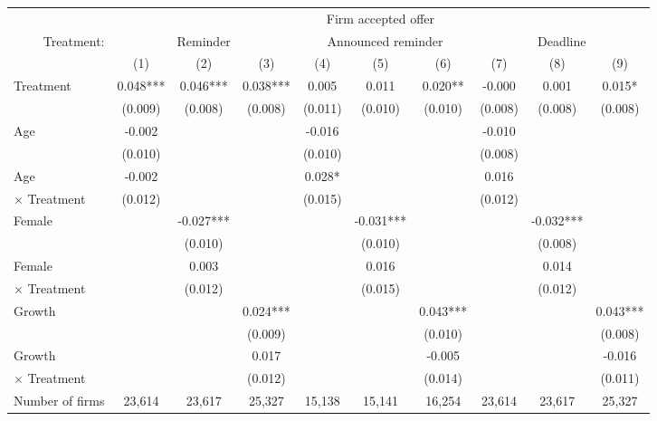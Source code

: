 \begin{tabular}{lccccccccc}
\toprule
 & \multicolumn{9}{c}{Firm accepted offer} \\
\cmidrule(lr){2-10}
\multicolumn{1}{r}{Treatment:} & \multicolumn{3}{c}{Reminder} & \multicolumn{3}{c}{Announced reminder} & \multicolumn{3}{c}{Deadline} \\
\cmidrule(lr){2-4} \cmidrule(lr){5-7} \cmidrule(lr){8-10}
 & (1) & (2) & (3) & (4) & (5) & (6) & (7) & (8) & (9) \\
\midrule
Treatment & 0.048*** & 0.046*** & 0.038*** & 0.005 & 0.011 & 0.020** & -0.000 & 0.001 & 0.015* \\ & (0.009) & (0.008) & (0.008) & (0.011) & (0.010) & (0.010) & (0.008) & (0.008) & (0.008) \\
Age & -0.002 &  &  & -0.016 &  &  & -0.010 &  &  \\ & (0.010) &  &  & (0.010) &  &  & (0.008) &  \\
Age & -0.002 &  &  & 0.028* &  &  & 0.016 &  &   \\
\hspace{1em} $\times$ Treatment & (0.012) &  &  & (0.015) &  &  & (0.012) &   \\
Female &  & -0.027*** &  &  & -0.031*** &  &  & -0.032*** &  \\ &  & (0.010) &  &  & (0.010) &  &  & (0.008) \\
Female &  & 0.003 &  &  & 0.016 &  &  & 0.014 &   \\
\hspace{1em} $\times$ Treatment &  & (0.012) &  &  & (0.015) &  &  & (0.012)  \\
Growth &  &  & 0.024*** &  &  & 0.043*** &  &  & 0.043*** \\ &  &  & (0.009) &  &  & (0.010) &  &  & (0.008) \\
Growth &  &  & 0.017 &  &  & -0.005 &  &  & -0.016  \\
\hspace{1em} $\times$ Treatment &  &  & (0.012) &  &  & (0.014) &  &  & (0.011)  \\
\midrule
Number of firms & 23,614 & 23,617 & 25,327 & 15,138 & 15,141 & 16,254 & 23,614 & 23,617 & 25,327 \\
\bottomrule
\end{tabular}
